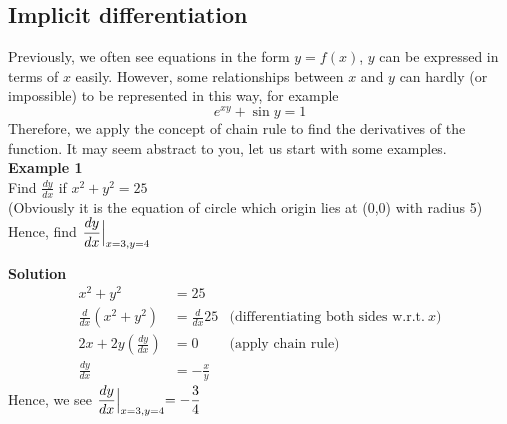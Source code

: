 \documentclass{article}
\begin{document}
\subsection{Implicit differentiation}
Previously, we often see equations in the
form $y=f(x)$, $y$ can be
expressed in terms of $x$ easily. However,
some relationships between $x$ and $y$ can
hardly (or impossible) to be represented
in this way, for example
\begin{equation*}
    e^{xy} +\sin y=1
\end{equation*}
Therefore, we apply the concept of chain
rule to find the derivatives of the
function. It may seem abstract to you,
let us start with some examples.\\
\textbf{Example 1}\\
Find $\displaystyle \frac{dy}{dx}$ if
$\displaystyle x^{2} +y^{2} =25$\\
 (Obviously it is the equation of circle which origin lies at (0,0) with radius 5)
 Hence, find $\displaystyle \frac{dy}{dx}\Bigl|_{x=3,y=4}$\\
\begin{center}
\end{center}
\textbf{Solution}\\
\begin{equation*}
\begin{aligned}
    x^{2} +y^{2} & =25 & \\
    \frac{d}{dx}\left( x^{2} +y^{2}\right) & =\frac{d}{dx} 25 & \text{(differentiating both sides w.r.t.} \ x\text{)}\\
    2x+2y\left(\frac{dy}{dx}\right) & =0 & \text{(apply chain rule)}\\
    \frac{dy}{dx} & =-\frac{x}{y} & 
\end{aligned}
\end{equation*}
Hence, we see $\displaystyle \frac{dy}{dx}\Bigl|_{x=3,y=4} =-\frac{3}{4}$\\
\end{document}
